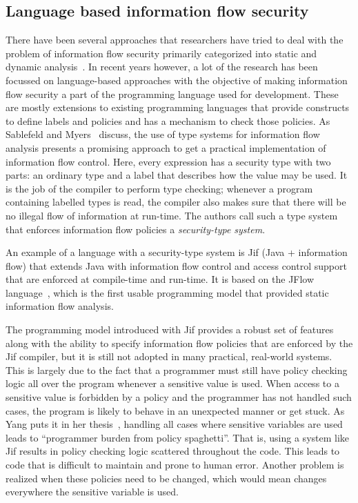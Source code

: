 \subsection{Language based information flow security \label{subsec:langinfo}}
There have been several approaches that researchers have tried to deal with the
problem of information flow security primarily categorized into static and dynamic
analysis~\cite{Russo, Chlipala}. In recent years however, a lot of the research has
been focussed on language-based approaches with the objective of making information
flow security a part of the programming language used for development. These are
mostly extensions to existing programming languages that provide constructs to define
labels and policies and has a mechanism to check those policies. As Sablefeld and
Myers~\cite{LangInfo} discuss, the use of type systems for information flow analysis
presents a promising approach to get a practical implementation of information
flow control. Here, every expression has a security type with two parts:
an ordinary type and a label that describes how the value may be used. It is the
job of the compiler to perform type checking; whenever a program containing labelled
types is read, the compiler also makes sure that there will be no illegal flow of
information at run-time. The authors call such a type system that enforces information
flow policies a \textit{security-type system}.

An example of a language with a security-type system is Jif (Java + information flow)
\cite{jifurl} that extends Java with information flow control and access control support
that are enforced at compile-time and run-time. It is based on the JFlow
language~\cite{Jflow}, which is the first usable programming model that provided
static information flow analysis.

The programming model introduced with Jif provides a robust set of features along
with the ability to specify information flow policies that are enforced by the Jif
compiler, but it is still not adopted in many practical, real-world systems. This is largely
due to the fact that a programmer must still have policy checking logic all over
the program whenever a sensitive value is used. When access to a sensitive value
is forbidden by a policy and the programmer has not handled such cases, the program
is likely to behave in an unexpected manner or get stuck. As Yang puts it in her
thesis~\cite{YangPhd}, handling all cases where sensitive variables are used leads
to ``programmer burden from policy spaghetti''. That is, using a system like Jif
results in policy checking logic scattered throughout the code. This leads to code
that is difficult to maintain and prone to human error. Another problem is realized
when these policies need to be changed, which would mean changes everywhere the
sensitive variable is used.

